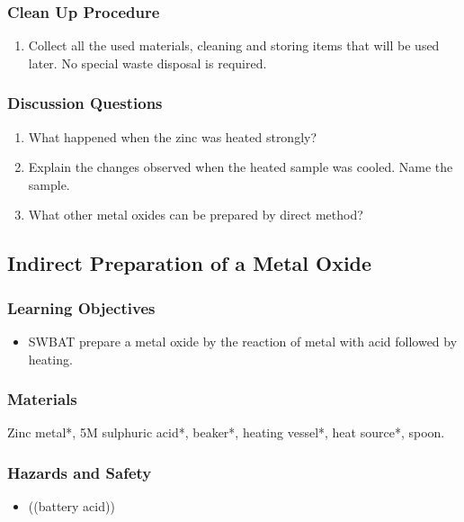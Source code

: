 \subsubsection*{Clean Up Procedure}
\begin{enumerate}
\item{Collect all the used materials, cleaning and storing items that will be used later. No special waste disposal is required.}
\end{enumerate}

\subsubsection*{Discussion Questions}
\begin{enumerate}
\item{What happened when the zinc was heated strongly?}
\item{Explain the changes observed when the heated sample was cooled. Name the sample.}
\item{What other metal oxides can be prepared by direct method?}
\end{enumerate}

\subsection{Indirect Preparation of a Metal Oxide}

\subsubsection*{Learning Objectives}
\begin{itemize}
\item{SWBAT prepare a metal oxide by the reaction of metal with acid followed by heating.}
\end{itemize}

\subsubsection*{Materials}
Zinc metal*, 5M sulphuric acid*, beaker*, heating vessel*, heat source*, spoon.

\subsubsection*{Hazards and Safety}
\begin{itemize}
\item{((battery acid))}
\end{itemize}

